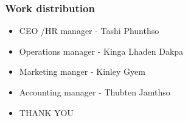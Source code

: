 \documentclass{beamer}
\begin{document}
\begin{frame}
	\frametitle{Work distribution}
	\begin{itemize}
		\item CEO /HR manager - Tashi Phunthso
		\item Operations manager - Kinga Lhaden Dakpa
		\item Marketing manger - Kinley Gyem
		\item Accounting manager - Thubten Jamthso
	\end{itemize}
\end{frame}
\begin{frame}
	\begin{itemize}
		\item THANK YOU
	\end{itemize}
\end{frame}
\end{document}
